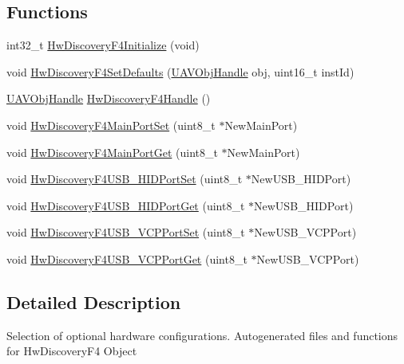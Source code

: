 \subsection*{\-Functions}
\begin{DoxyCompactItemize}
\item 
int32\-\_\-t \hyperlink{group___hw_discovery_f4_ga165e936ef608c106a3092a3a376fb813}{\-Hw\-Discovery\-F4\-Initialize} (void)
\item 
void \hyperlink{group___hw_discovery_f4_ga7905a69be0308e484b498b2d2c4619a7}{\-Hw\-Discovery\-F4\-Set\-Defaults} (\hyperlink{targets_2_u_a_v_objects_2inc_2uavobjectmanager_8h_a279053e22be53ce9f895043aaeb91e3b}{\-U\-A\-V\-Obj\-Handle} obj, uint16\-\_\-t inst\-Id)
\item 
\hyperlink{targets_2_u_a_v_objects_2inc_2uavobjectmanager_8h_a279053e22be53ce9f895043aaeb91e3b}{\-U\-A\-V\-Obj\-Handle} \hyperlink{group___hw_discovery_f4_gad0792026af879dae10897f2f3c438443}{\-Hw\-Discovery\-F4\-Handle} ()
\item 
void \hyperlink{group___hw_discovery_f4_gabc4dea3299c3d5578561ae3c221bc678}{\-Hw\-Discovery\-F4\-Main\-Port\-Set} (uint8\-\_\-t $\ast$\-New\-Main\-Port)
\item 
void \hyperlink{group___hw_discovery_f4_ga3656f8d80e922d8d4f9cff0fc83eb2b7}{\-Hw\-Discovery\-F4\-Main\-Port\-Get} (uint8\-\_\-t $\ast$\-New\-Main\-Port)
\item 
void \hyperlink{group___hw_discovery_f4_ga2a6b44320e571a90653e04211ef6fcc7}{\-Hw\-Discovery\-F4\-U\-S\-B\-\_\-\-H\-I\-D\-Port\-Set} (uint8\-\_\-t $\ast$\-New\-U\-S\-B\-\_\-\-H\-I\-D\-Port)
\item 
void \hyperlink{group___hw_discovery_f4_gabf6aa317f218f8a50d6b2fafc3aedb7e}{\-Hw\-Discovery\-F4\-U\-S\-B\-\_\-\-H\-I\-D\-Port\-Get} (uint8\-\_\-t $\ast$\-New\-U\-S\-B\-\_\-\-H\-I\-D\-Port)
\item 
void \hyperlink{group___hw_discovery_f4_ga6de437e73f0a3cc34913b18fdc5aa513}{\-Hw\-Discovery\-F4\-U\-S\-B\-\_\-\-V\-C\-P\-Port\-Set} (uint8\-\_\-t $\ast$\-New\-U\-S\-B\-\_\-\-V\-C\-P\-Port)
\item 
void \hyperlink{group___hw_discovery_f4_gaf9b936abaf0761010eccefef4935b65f}{\-Hw\-Discovery\-F4\-U\-S\-B\-\_\-\-V\-C\-P\-Port\-Get} (uint8\-\_\-t $\ast$\-New\-U\-S\-B\-\_\-\-V\-C\-P\-Port)
\end{DoxyCompactItemize}


\subsection{\-Detailed \-Description}
\-Selection of optional hardware configurations. \-Autogenerated files and functions for \-Hw\-Discovery\-F4 \-Object 

